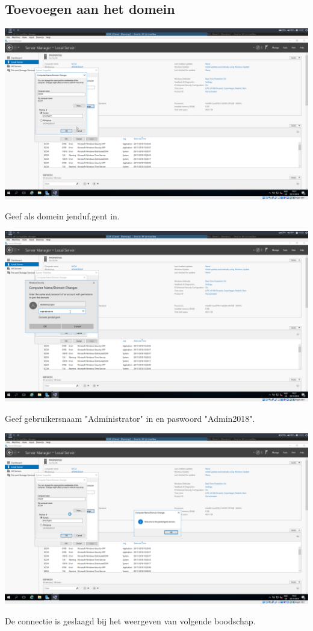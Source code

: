 \documentclass[a4paper]{article}
\begin{document}
\subsection{Toevoegen aan het domein}
\begin{center}
	\includegraphics[width=15cm]{Pictures/SCCM/0/1543483352.png}
	
	Geef als domein jenduf.gent in.
\end{center}
\begin{center}
	\includegraphics[width=15cm]{Pictures/SCCM/0/1543483358.png}
	
	Geef gebruikersnaam "Administrator" in en paswoord "Admin2018".
\end{center}
\begin{center}
	\includegraphics[width=15cm]{Pictures/SCCM/0/1543483399.png}
	
	De connectie is geslaagd bij het weergeven van volgende boodschap.
\end{center}
\end{document}
